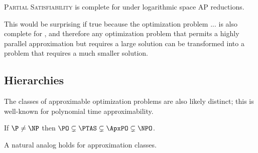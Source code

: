 \documentclass[]{article}
\begin{document}
\begin{conjecture}
  \textsc{Partial Satisfiability} is complete for \ApxNCO{} under logarithmic space AP reductions.
\end{conjecture}

This would be surprising if true because the optimization problem ... is also complete for \ApxNCO, and therefore any optimization problem that permits a highly parallel approximation but requires a large solution can be transformed into a problem that requires a much smaller solution.

\subsection{Hierarchies}\label{sec:hierarchies}

The classes of approximable optimization problems are also likely distinct; this is well-known for polynomial time approximability.

\begin{theorem}
  If $\P \neq \NP$ then $\PO \subsetneq \PTAS \subsetneq \ApxPO \subsetneq \NPO$.
\end{theorem}

A natural analog holds for \NC{} approximation classes.
\end{document}
